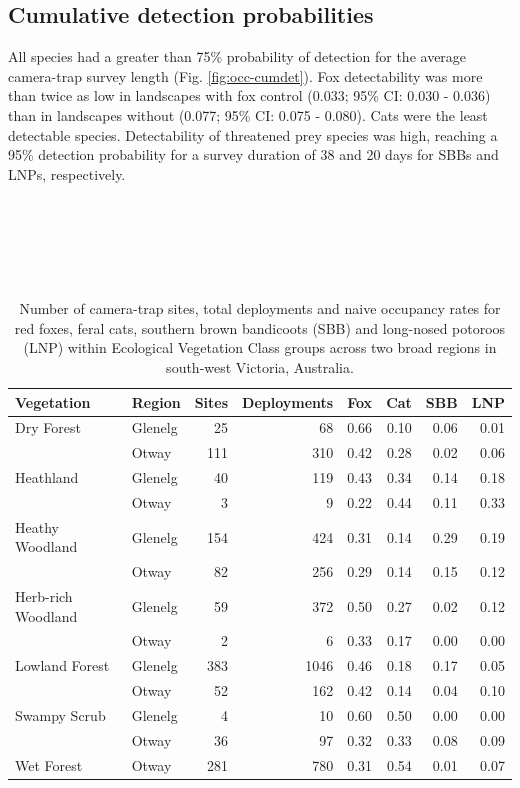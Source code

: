 \documentclass[11pt,a4paper,titlepage,twoside,openright]{style/unimelbthesis}
\begin{document}
\begin{mainmatter}
\hypertarget{cumulative-detection-probabilities-1}{%
\subsection{Cumulative detection probabilities}\label{cumulative-detection-probabilities-1}}

All species had a greater than 75\% probability of detection for the average camera-trap survey length (Fig. \ref{fig:occ-cumdet}). Fox detectability was more than twice as low in landscapes with fox control (0.033; 95\% CI: 0.030 - 0.036) than in landscapes without (0.077; 95\% CI: 0.075 - 0.080). Cats were the least detectable species. Detectability of threatened prey species was high, reaching a 95\% detection probability for a survey duration of 38 and 20 days for SBBs and LNPs, respectively.

\newpage

\(~\)

\(~\)

\(~\)

\begingroup\fontsize{10}{12}\selectfont
\begin{longtable}[t]{llrrrrrr}
\caption{\label{tab:occ-naive}Number of camera-trap sites, total deployments and naive occupancy rates for red foxes, feral cats, southern brown bandicoots (SBB) and long-nosed potoroos (LNP) within Ecological Vegetation Class groups across two broad regions in south-west Victoria, Australia.}\\
\toprule
Vegetation & Region & Sites & Deployments & Fox & Cat & SBB & LNP\\
\midrule
Dry Forest & Glenelg & 25 & 68 & 0.66 & 0.10 & 0.06 & 0.01\\
 & Otway & 111 & 310 & 0.42 & 0.28 & 0.02 & 0.06\\
Heathland & Glenelg & 40 & 119 & 0.43 & 0.34 & 0.14 & 0.18\\
 & Otway & 3 & 9 & 0.22 & 0.44 & 0.11 & 0.33\\
Heathy Woodland & Glenelg & 154 & 424 & 0.31 & 0.14 & 0.29 & 0.19\\
\addlinespace
 & Otway & 82 & 256 & 0.29 & 0.14 & 0.15 & 0.12\\
Herb-rich Woodland & Glenelg & 59 & 372 & 0.50 & 0.27 & 0.02 & 0.12\\
 & Otway & 2 & 6 & 0.33 & 0.17 & 0.00 & 0.00\\
Lowland Forest & Glenelg & 383 & 1046 & 0.46 & 0.18 & 0.17 & 0.05\\
 & Otway & 52 & 162 & 0.42 & 0.14 & 0.04 & 0.10\\
\addlinespace
Swampy Scrub & Glenelg & 4 & 10 & 0.60 & 0.50 & 0.00 & 0.00\\
 & Otway & 36 & 97 & 0.32 & 0.33 & 0.08 & 0.09\\
Wet Forest & Otway & 281 & 780 & 0.31 & 0.54 & 0.01 & 0.07\\
\bottomrule
\end{longtable}
\endgroup{}


\end{mainmatter}
\end{document}
